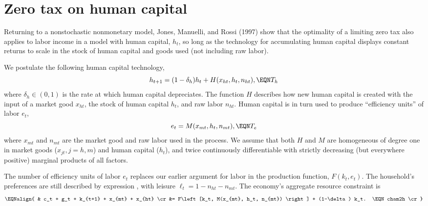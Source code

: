 



 
  
\section{Zero tax on human capital}
Returning to a nonstochastic nonmonetary model, Jones, Manuelli, and Rossi (1997)
show that the optimality of a limiting zero tax also applies to labor
income in a model with human capital, $h_t$, so long as the technology
for accumulating human capital displays constant returns to scale in
the stock of human capital and goods used (not including raw labor).

We postulate the following human capital technology,
$$
h_{t+1} = (1-\delta_h) h_t + H(x_{ht}, h_t, n_{ht}),   \EQN T_h
$$
where $\delta_h \in (0,1)$ is the rate at which human capital
depreciates. The function $H$ describes how new human capital
is created with the input of a market good $x_{ht}$, the stock
of human capital $h_t$, and raw labor $n_{ht}$. Human capital
is in turn used to produce ``efficiency units'' of labor $e_t$,
$$
e_t = M(x_{mt}, h_t, n_{mt}),                          \EQN T_e
$$
where $x_{mt}$ and $n_{mt}$ are the market good and raw labor
used in the process. We assume that both $H$ and $M$ are
homogeneous of degree one in market goods ($x_{jt}, j=h,m$)
and human capital ($h_t$), and twice continuously differentiable
with strictly decreasing (but everywhere positive) marginal
products of all factors.

The number of  efficiency units of labor $e_t$ replaces our earlier argument
for labor in the production function,
$F(k_t, e_t)$. The household's preferences are still
described by  expression , with leisure
$\ell_t = 1 - n_{ht} - n_{mt}$. The economy's
aggregate resource constraint is
$$\EQNalign{ & c_t + g_t + k_{t+1} + x_{mt} + x_{ht}  \cr
  &= F\left[k_t, M(x_{mt}, h_t, n_{mt}) \right] + (1-\delta) k_t. \EQN cham2h
                                                                        \cr}$$

